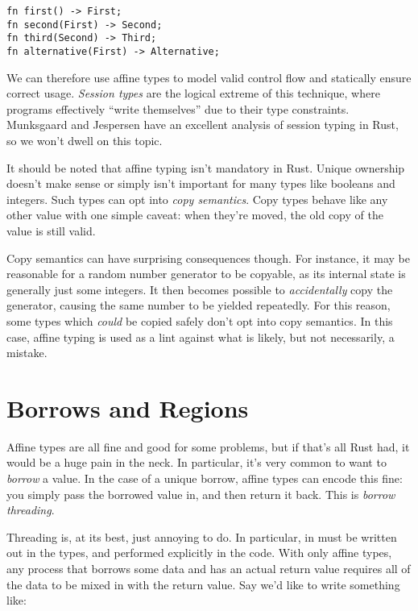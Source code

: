 \begin{verbatim}
fn first() -> First;
fn second(First) -> Second;
fn third(Second) -> Third;
fn alternative(First) -> Alternative;
\end{verbatim}

We can therefore use affine types to model valid control flow and statically
ensure correct usage. \emph{Session types} are the logical extreme of this
technique, where programs effectively ``write themselves'' due to their type
constraints. Munksgaard and Jespersen \cite{munksgaard2015practical} have an
excellent analysis of session typing in Rust, so we won't dwell on this topic.

It should be noted that affine typing isn't mandatory in Rust. Unique ownership
doesn't make sense or simply isn't important for many types like booleans and
integers. Such types can opt into \emph{copy semantics}. Copy types behave like any
other value with one simple caveat: when they're moved, the old copy of the
value is still valid.

Copy semantics can have surprising consequences though. For instance, it may be
reasonable for a random number generator to be copyable, as its internal
state is generally just some integers. It then becomes possible to
\emph{accidentally} copy the generator, causing the same number to be yielded
repeatedly. For this reason, some types which \emph{could} be copied safely don't opt
into copy semantics. In this case, affine typing is used as a lint against what
is likely, but not necessarily, a mistake.





\section{Borrows and Regions}

Affine types are all fine and good for some problems, but if that's all Rust had,
it would be a huge pain in the neck. In particular, it's very common to want
to \emph{borrow} a value. In the case of a unique borrow, affine types can encode
this fine: you simply pass the borrowed value in, and then return it back. This
is \emph{borrow threading}.

Threading is, at its best, just annoying to do. In particular, in must be written
out in the types, and performed explicitly in the code. With only affine types,
any process that borrows some data and has an actual return value requires
all of the data to be mixed in with the return value. Say we'd like to write
something like:

